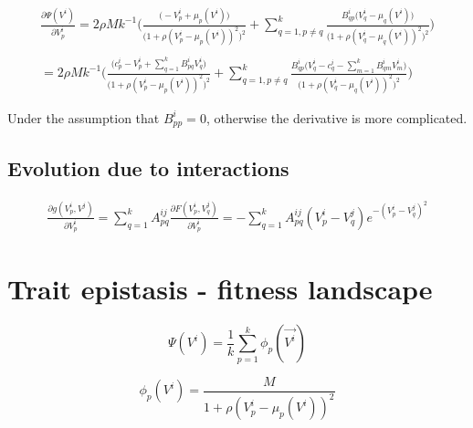 \documentclass[
12.5pt, 					%
a4paper, 				%
oneside,					%
headinclude,footinclude, %
BCOR5mm, 				%
abstract=on
]{scrreprt}
\numberwithin{equation}{chapter}
\begin{document}
\begin{equation}
\label{eq:trait_change_interactions}
\begin{aligned}
\frac{\partial \Psi(V^i)}{\partial V^i_p} = 
2 \rho M k^{-1} \Bigg(
\frac{ \big(-V^i_p + \mu_p(V^i) \big) }
{\big(1+ \rho (V^i_p-\mu_p(V^i))^2\big)^2} +
\sum_{q=1, p \neq q}^{k}
\frac{ B^i_{qp} \big(V^i_q - \mu_q(V^i))}
{\big(1+ \rho (V^i_q-\mu_q(V^i))^2\big)^2} 
\Bigg)
\\ \\
=
2 \rho M k^{-1} \Bigg(
\frac{ \big(c^i_p-V^i_p + \sum_{q=1}^{k} B^i_{pq} V^i_q\big) }
{\big(1+ \rho (V^i_p-\mu_p(V^i))^2\big)^2} +
\sum_{q=1, p \neq q}^{k}
\frac{ B^i_{qp} \big(V^i_q - c^i_q - \sum_{m=1}^{k} B^i_{qm} V^i_m\big)}
{\big(1+ \rho (V^i_q-\mu_q(V^i))^2\big)^2}
\Bigg)
\end{aligned}
\end{equation}
\newline


Under the assumption that $B^i_{pp}=0$, otherwise the derivative is more complicated.

\subsection*{Evolution due to interactions}
\vspace{0.5cm}

\begin{equation}
\label{eq:trait_change_interactions}
\begin{aligned}
\frac{\partial g(V^i_p, V^j)}{\partial V^i_p} = 
\sum_{q=1}^{k}
A^{ij}_{pq} 
\frac{\partial F(V^i_p, V^j_q)}{\partial V^i_p}  
= 
- \sum_{q=1}^{k} A^{ij}_{pq} (V^i_p - V^j_q) e^{-(V^i_p - V^j_q)^2}  
\end{aligned}
\end{equation}




\section*{Trait epistasis - fitness landscape}

\begin{equation}
\label{eq:fitness_function}
\Psi(V^i) = \frac{1}{k}\sum_{p=1}^k \phi_p(\vec{V^i})
\end{equation}

\begin{equation}
\label{eq:fitness_function_trait_contribution}
\phi_p(V^i) = \frac{M}{1+ \rho (V^i_p-\mu_p(V^i))^2}
\end{equation}
\end{document}
